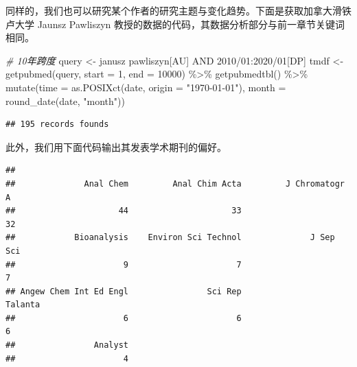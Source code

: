 \documentclass[]{tufte-book}
\newenvironment{Shaded}{}{}
\newcommand{\AttributeTok}[1]{\textcolor[rgb]{0.49,0.56,0.16}{#1}}
\newcommand{\CommentTok}[1]{\textcolor[rgb]{0.38,0.63,0.69}{\textit{#1}}}
\newcommand{\DecValTok}[1]{\textcolor[rgb]{0.25,0.63,0.44}{#1}}
\newcommand{\FunctionTok}[1]{\textcolor[rgb]{0.02,0.16,0.49}{#1}}
\newcommand{\NormalTok}[1]{#1}
\newcommand{\OtherTok}[1]{\textcolor[rgb]{0.00,0.44,0.13}{#1}}
\newcommand{\SpecialCharTok}[1]{\textcolor[rgb]{0.25,0.44,0.63}{#1}}
\newcommand{\StringTok}[1]{\textcolor[rgb]{0.25,0.44,0.63}{#1}}
\begin{document}
同样的，我们也可以研究某个作者的研究主题与变化趋势。下面是获取加拿大滑铁卢大学 Jaunsz Pawliszyn 教授的数据的代码，其数据分析部分与前一章节关键词相同。

\begin{Shaded}
\begin{Highlighting}[]
\CommentTok{\# 10年跨度}
\NormalTok{query }\OtherTok{\textless{}{-}} \StringTok{\textquotesingle{}janusz pawliszyn[AU] AND 2010/01:2020/01[DP]\textquotesingle{}}
\NormalTok{tmdf }\OtherTok{\textless{}{-}} \FunctionTok{getpubmed}\NormalTok{(query, }\AttributeTok{start =} \DecValTok{1}\NormalTok{, }\AttributeTok{end =} \DecValTok{10000}\NormalTok{) }\SpecialCharTok{\%\textgreater{}\%}
        \FunctionTok{getpubmedtbl}\NormalTok{() }\SpecialCharTok{\%\textgreater{}\%}
        \FunctionTok{mutate}\NormalTok{(}\AttributeTok{time =} \FunctionTok{as.POSIXct}\NormalTok{(date, }\AttributeTok{origin =} \StringTok{"1970{-}01{-}01"}\NormalTok{),}
         \AttributeTok{month =} \FunctionTok{round\_date}\NormalTok{(date, }\StringTok{"month"}\NormalTok{))}
\end{Highlighting}
\end{Shaded}

\begin{verbatim}
## 195 records founds
\end{verbatim}

此外，我们用下面代码输出其发表学术期刊的偏好。

\begin{Shaded}
\end{Shaded}

\begin{verbatim}
## 
##              Anal Chem         Anal Chim Acta         J Chromatogr A 
##                     44                     33                     32 
##            Bioanalysis    Environ Sci Technol              J Sep Sci 
##                      9                      7                      7 
## Angew Chem Int Ed Engl                Sci Rep                Talanta 
##                      6                      6                      6 
##                Analyst 
##                      4
\end{verbatim}
\end{document}
